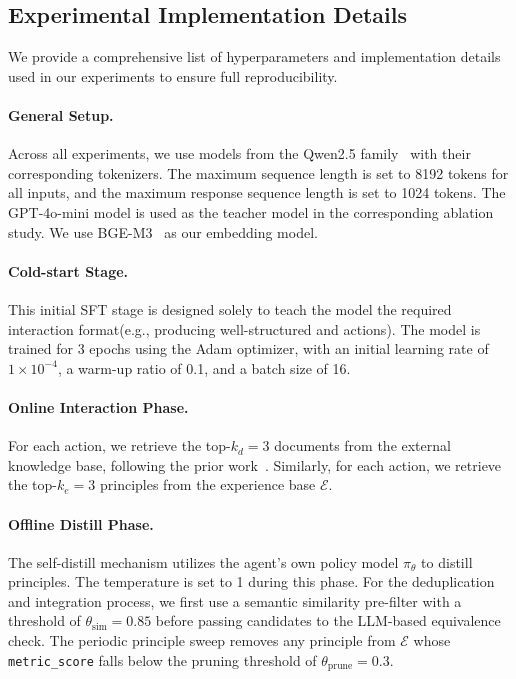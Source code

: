 \subsection{Experimental Implementation Details}
\label{appendix:setups}
We provide a comprehensive list of hyperparameters and implementation details used in our experiments to ensure full reproducibility.

\paragraph{General Setup.}
Across all experiments, we use models from the Qwen2.5 family~\citep{qwen2025qwen25technicalreport} with their corresponding tokenizers. The maximum sequence length is set to 8192 tokens for all inputs, and the maximum response sequence length is set to 1024 tokens. The GPT-4o-mini model is used as the teacher model in the corresponding ablation study. We use BGE-M3~\citep{chen2024bge} as our embedding model.

\paragraph{Cold-start Stage.}
This initial SFT stage is designed solely to teach the model the required interaction format(e.g., producing well-structured  and  actions). The model is trained for 3 epochs using the Adam optimizer, with an initial learning rate of $1\times10^{-4}$, a warm-up ratio of 0.1, and a batch size of 16.

\paragraph{Online Interaction Phase.}
For each  action, we retrieve the top-$k_d=3$ documents from the external knowledge base, following the prior work~\citep{jin2025searchr1trainingllmsreason}. Similarly, for each  action, we retrieve the top-$k_e=3$ principles from the experience base $\mathcal{E}$.

\paragraph{Offline Distill Phase.}
The self-distill mechanism utilizes the agent's own policy model $\pi_\theta$ to distill principles. The temperature is set to 1 during this phase. For the deduplication and integration process, we first use a semantic similarity pre-filter with a threshold of $\theta_{\text{sim}} = 0.85$ before passing candidates to the LLM-based equivalence check. The periodic principle sweep removes any principle from $\mathcal{E}$ whose \texttt{metric\_score} falls below the pruning threshold of $\theta_{\text{prune}} = 0.3$.


